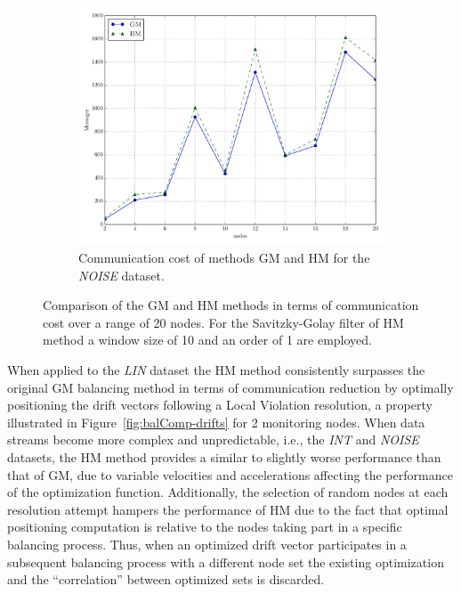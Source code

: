 \begin{figure}[!h]
\begin{subfigure}{0.32\textwidth}%
  \includegraphics[width=\linewidth]{img/bal_msg_noisyinterweaving_nodes.pdf}
  \caption{Communication cost of methods GM and HM for the \emph{NOISE} dataset.}
\end{subfigure}
\vspace{0.5cm}
\caption{Comparison of the GM and HM methods in terms of communication cost over a range of 20 nodes. For the Savitzky-Golay filter of HM method a window size of 10 and an order of 1 are employed.} \label{fig:balComp-msgs}
\end{figure}

When applied to the \emph{LIN} dataset the HM method consistently surpasses the original GM balancing method in terms of communication reduction by optimally positioning the drift vectors following a Local Violation resolution, a property illustrated in Figure~\ref{fig:balComp-drifts} for 2 monitoring nodes. When data streams become more complex and unpredictable, i.e., the \emph{INT} and \emph{NOISE} datasets, the HM method provides a similar to slightly worse performance than that of GM, due to variable velocities and accelerations affecting the performance of the optimization function. Additionally, the selection of random nodes at each resolution attempt hampers the performance of HM due to the fact that optimal positioning computation is relative to the nodes taking part in a specific balancing process. Thus, when an optimized drift vector participates in a subsequent balancing process with a different node set the existing optimization and the ``correlation'' between optimized sets is discarded.

